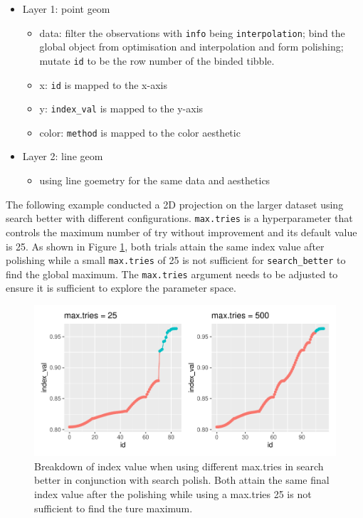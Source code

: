 \documentclass[12pt]{article}
\providecommand{\tightlist}{%
  \setlength{\itemsep}{0pt}\setlength{\parskip}{0pt}}
\begin{document}
\begin{itemize}
\tightlist
\item
  Layer 1: point geom

  \begin{itemize}
  \tightlist
  \item
    data: filter the observations with \texttt{info} being
    \texttt{interpolation}; bind the global object from optimisation and
    interpolation and form polishing; mutate \texttt{id} to be the row
    number of the binded tibble.
  \item
    x: \texttt{id} is mapped to the x-axis
  \item
    y: \texttt{index\_val} is mapped to the y-axis
  \item
    color: \texttt{method} is mapped to the color aesthetic
  \end{itemize}
\item
  Layer 2: line geom

  \begin{itemize}
  \tightlist
  \item
    using line goemetry for the same data and aesthetics
  \end{itemize}
\end{itemize}

The following example conducted a 2D projection on the larger dataset
using search better with different configurations. \texttt{max.tries} is
a hyperparameter that controls the maximum number of try without
improvement and its default value is 25. As shown in Figure
\ref{trace-compare}, both trials attain the same index value after
polishing while a small \texttt{max.tries} of 25 is not sufficient for
\texttt{search\_better} to find the global maximum. The
\texttt{max.tries} argument needs to be adjusted to ensure it is
sufficient to explore the parameter space.

\begin{figure}
\centering
\includegraphics{paper_files/figure-latex/polish-1.pdf}
\caption{\label{trace-compare}Breakdown of index value when using
different max.tries in search better in conjunction with search polish.
Both attain the same final index value after the polishing while using a
max.tries 25 is not sufficient to find the ture maximum.}
\end{figure}
\end{document}
